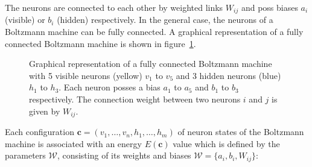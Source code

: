 The neurons are 
connected to each other by weighted links $W_{ij}$ and poss biases $a_i$ (visible) or $b_i$ (hidden) respectively. In the
general case, the neurons of a Boltzmann machine can be fully connected. A graphical representation of a fully connected Boltzmann machine is shown in figure~\ref{fig:boltzmannMachine}.

\begin{figure}[H]
    \label{fig:boltzmannMachine}
    \centering
    \caption{Graphical representation of a fully connected Boltzmann machine with 5 visible neurons (yellow) $v_1$ to $v_5$
    and 3 hidden neurons (blue) $h_1$ to $h_3$. Each neuron posses a bias
    $a_1$ to $a_5$ and $b_1$ to $b_3$ respectively. The connection weight between two neurons $i$ and $j$
    is given by $W_{ij}$.}
\end{figure}

Each configuration $\bm{c}=(v_1,\dots,v_n,h_1,\dots,h_m)$ of neuron states
of the Boltzmann machine is associated with an energy $E(\bm{c})$ value
which is defined by the parameters $\mathcal{W}$, consisting of its weights and 
biases $\mathcal{W} = \{a_i, b_i, W_{ij}\}$:

